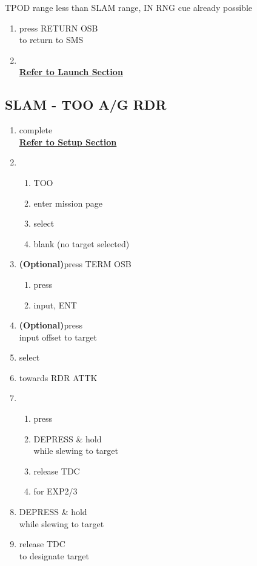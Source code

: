 \documentclass[fontHelvetica, widesubsec]{TechCheck}
\begin{document}
	 TPOD range less than SLAM range, IN RNG cue already possible
	\begin{enumerate}[resume]
		\item {}\dotfill press RETURN OSB \\
		\hfill to return to SMS
		\item {} \\
		\hfill \hyperref[subsec:84launch]{\textbf{Refer to Launch Section}}
	\end{enumerate}

	\subsection{SLAM - TOO A/G RDR}
	\begin{enumerate}
		\item {}\dotfill complete \\
		\hfill \hyperref[subsec:84setup]{\textbf{Refer to Setup Section}}
		\item {}
		\begin{enumerate}
			\item {}\dotfill TOO
			\item {}\dotfill enter mission page
			\item {}\dotfill select
			\item {}\dotfill blank (no target selected)
		\end{enumerate}
		\item {} \textbf{(Optional)}\dotfill press TERM OSB
		\begin{enumerate}
			\item {}\dotfill press
			\item {}\dotfill input, ENT
		\end{enumerate}
		\item {} \textbf{(Optional)}\dotfill press \\
		\hfill input offset to target
		\item {}\dotfill select
		\item {}\dotfill towards RDR ATTK
		\item {}
		\begin{enumerate}
			\item {}\dotfill press
			\item {}\dotfill DEPRESS \& hold \\
			\hfill while slewing to target
			\item {}\dotfill release TDC
			\item {}\dotfill for EXP2/3
		\end{enumerate}
		\item {}\dotfill DEPRESS \& hold \\
		\hfill while slewing to target
		\item {}\dotfill release TDC \\
		\hfill to designate target
	\end{enumerate}
\end{document}
